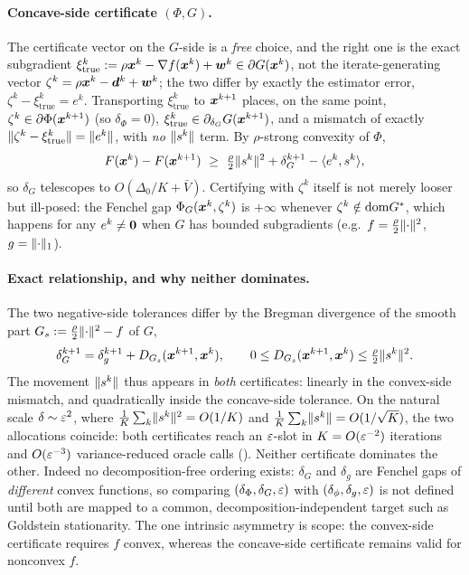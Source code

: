 \paragraph{Concave-side certificate $(\Phi,G)$.} The certificate vector on
the $G$-side is a \emph{free} choice, and the right one is the exact
subgradient
$\xi^k_{\mathrm{true}}:=\rho\bm{x}^k-\nabla f(\bm{x}^k)+\bm{w}^k\in\partial G(\bm{x}^k)$,
not the iterate-generating vector $\zeta^k=\rho\bm{x}^k-\bm{d}^k+\bm{w}^k$; the two
differ by exactly the estimator error,
$\zeta^k-\xi^k_{\mathrm{true}}=e^k$. Transporting $\xi^k_{\mathrm{true}}$
to $\bm{x}^{k+1}$ places, on the same point,
$\zeta^k\in\partial\Phi(\bm{x}^{k+1})$ (so $\delta_\Phi=0$),
$\xi^k_{\mathrm{true}}\in\partial_{\delta_G}G(\bm{x}^{k+1})$, and a mismatch
of exactly $\lVert \zeta^k-\xi^k_{\mathrm{true}}\rVert=\lVert e^k\rVert$, with
\emph{no} $\lVert s^k\rVert$ term. By $\rho$-strong convexity of $\Phi$,
\[
    F(\bm{x}^k)-F(\bm{x}^{k+1})
    \ \ge\
    \tfrac{\rho}{2}\lVert s^k\rVert^2+\delta_G^{k+1}-\langle e^k,s^k\rangle,
\]
so $\delta_G$ telescopes to $O(\Delta_0/K+\bar V)$. Certifying with
$\zeta^k$ itself is not merely looser but ill-posed: the Fenchel gap
$\Phi_G(\bm{x}^k,\zeta^k)$ is $+\infty$ whenever $\zeta^k\notin\mathrm{dom} G^*$,
which happens for any $e^k\neq\bm{0}$ when $G$ has bounded subgradients
(e.g.\ $f=\tfrac\rho2\lVert \cdot\rVert^2$, $g=\lVert \cdot\rVert_1$).

\paragraph{Exact relationship, and why neither dominates.} The two
negative-side tolerances differ by the Bregman divergence of the smooth
part $G_s:=\tfrac\rho2\lVert \cdot\rVert^2-f$ of $G$,
\begin{equation}
    \delta_G^{k+1}=\delta_g^{k+1}+D_{G_s}(\bm{x}^{k+1},\bm{x}^k),
    \qquad
    0\le D_{G_s}(\bm{x}^{k+1},\bm{x}^k)\le\tfrac{\rho}{2}\lVert s^k\rVert^2 .
    \label{eq:cert-bregman-gap}
\end{equation}
The movement $\lVert s^k\rVert$ thus appears in \emph{both} certificates:
linearly in the convex-side mismatch, and quadratically inside the
concave-side tolerance. On the natural scale $\delta\sim\varepsilon^2$, where
$\tfrac1K\sum_k\lVert s^k\rVert^2=O(1/K)$ and
$\tfrac1K\sum_k\lVert s^k\rVert=O(1/\sqrt K)$, the two allocations coincide:
both certificates reach an $\varepsilon$-slot in $K=O(\varepsilon^{-2})$ iterations and
$O(\varepsilon^{-3})$ variance-reduced oracle calls
(). Neither certificate dominates the other.
Indeed no decomposition-free ordering exists: $\delta_G$ and $\delta_g$
are Fenchel gaps of \emph{different} convex functions, so comparing
$(\delta_\Phi,\delta_G,\varepsilon)$ with $(\delta_\phi,\delta_g,\varepsilon)$ is not
defined until both are mapped to a common, decomposition-independent
target such as Goldstein stationarity. The one intrinsic asymmetry is
scope: the convex-side certificate requires $f$ convex, whereas the
concave-side certificate remains valid for nonconvex $f$.

